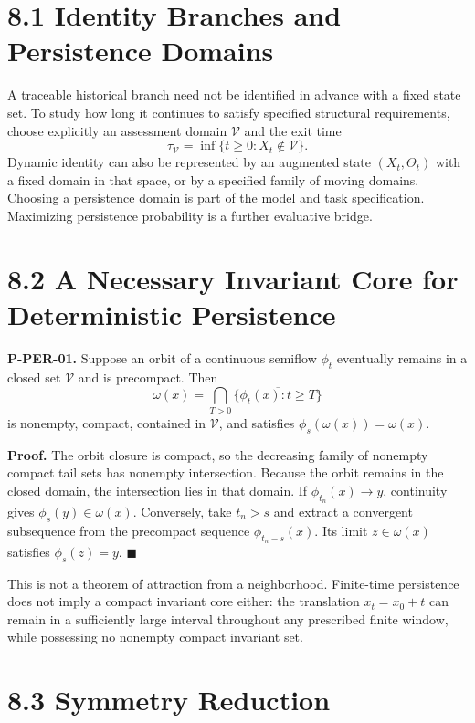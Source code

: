 \documentclass[
  english,
  11pt,
  oneside]{book}
\newcounter{none} %
\begin{document}
\section{8.1 Identity Branches and Persistence Domains}\label{identity-branches-and-persistence-domains}

A traceable historical branch need not be identified in advance with a fixed state set. To study how long it continues to satisfy specified structural requirements, choose explicitly an assessment domain \(\mathcal V\) and the exit time \[\tau_{\mathcal V}=\inf\{t\ge0:X_t\notin\mathcal V\}.\] Dynamic identity can also be represented by an augmented state \((X_t,\Theta_t)\) with a fixed domain in that space, or by a specified family of moving domains. Choosing a persistence domain is part of the model and task specification. Maximizing persistence probability is a further evaluative bridge.

\section{8.2 A Necessary Invariant Core for Deterministic Persistence}\label{a-necessary-invariant-core-for-deterministic-persistence}

\hypertarget{p-per-01}{}\label{p-per-01}

\textbf{P-PER-01.} Suppose an orbit of a continuous semiflow \(\phi_t\) eventually remains in a closed set \(\mathcal V\) and is precompact. Then \[\omega(x)=\bigcap_{T>0}\overline{\{\phi_t(x):t\ge T\}}\] is nonempty, compact, contained in \(\mathcal V\), and satisfies \(\phi_s(\omega(x))=\omega(x)\).

\textbf{Proof.} The orbit closure is compact, so the decreasing family of nonempty compact tail sets has nonempty intersection. Because the orbit remains in the closed domain, the intersection lies in that domain. If \(\phi_{t_n}(x)\to y\), continuity gives \(\phi_s(y)\in\omega(x)\). Conversely, take \(t_n>s\) and extract a convergent subsequence from the precompact sequence \(\phi_{t_n-s}(x)\). Its limit \(z\in\omega(x)\) satisfies \(\phi_s(z)=y\). \(\blacksquare\)

This is not a theorem of attraction from a neighborhood. Finite-time persistence does not imply a compact invariant core either: the translation \(x_t=x_0+t\) can remain in a sufficiently large interval throughout any prescribed finite window, while possessing no nonempty compact invariant set.

\section{8.3 Symmetry Reduction}\label{symmetry-reduction}
\end{document}
